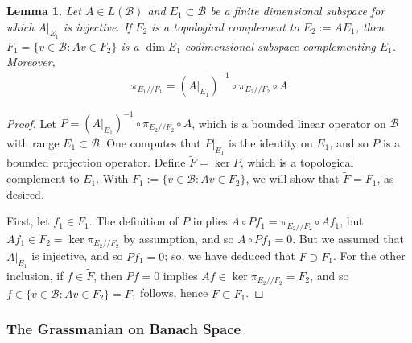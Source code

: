 \documentclass[11pt]{amsart}
\theoremstyle{theorem}
\newtheorem{lem}[thm]{Lemma}
\theoremstyle{definition}
\numberwithin{equation}{section}
\newcommand{\Bc}{\mathcal{B}}
\renewcommand{\tilde}{\widetilde}
\newcommand{\ds}{/ \! /}
\begin{document}
\begin{lem}\label{lem:splittingExist}
Let $A \in L(\Bc)$ and $E_1 \subset \Bc$ be a finite dimensional subspace for which $A|_{E_1}$ is injective. If $F_2$ is a topological complement to $E_2 := A E_1$, then $F_1 = \{v \in \Bc : A v \in F_2\}$ is a $\dim E_1$-codimensional subspace complementing $E_1$. Moreover,
\begin{align}\label{eq:projectionForm}
\pi_{E_1 \ds F_1} = (A|_{E_1})^{-1} \circ \pi_{E_2 \ds F_2} \circ A
\end{align}

\end{lem}
\begin{proof}
Let $P = (A|_{E_1})^{-1} \circ \pi_{E_2 \ds F_2} \circ A$, which is a bounded linear operator on $\Bc$ with range $E_1 \subset \Bc$. One computes that $P|_{E_1}$ is the identity on $E_1$, and so $P$ is a bounded projection operator.  Define $\tilde{F} = \ker P$, which is a topological complement to $E_1$. With $F_1 := \{v \in \Bc : A v \in F_2\}$, we will show that $\tilde{F} = F_1$, as desired. 

First, let $f_1 \in F_1$. The definition of $P$ implies $A \circ P f_1 = \pi_{E_2 \ds F_2} \circ  A f_1$, but $A f_1 \in F_2 = \ker \pi_{E_2 \ds F_2}$ by assumption, and so $A \circ P f_1 = 0$. But we assumed that $A|_{E_1}$ is injective, and so $P f_1 = 0$; so, we have deduced that $\tilde{F} \supset F_1$. For the other inclusion, if $f \in \tilde{F}$, then $P f = 0$ implies $A f \in \ker \pi_{E_2 \ds F_2} = F_2$, and so $f \in \{v \in \Bc : A v \in F_2\} = F_1$ follows, hence $ \tilde{F} \subset F_1$.
\end{proof}




\subsubsection{The Grassmanian on Banach Space}
\end{document}
